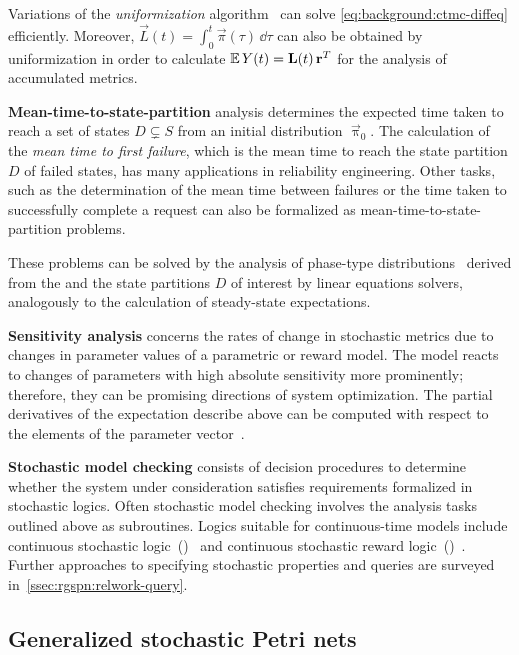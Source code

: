 Variations of the \emph{uniformization} algorithm~ can solve \cref{eq:background:ctmc-diffeq} efficiently. Moreover, \(\vec{L}(t) = \int_{0}^{t} \vec{\pi}(\tau) \,\dd\tau\) can also be obtained by uniformization in order to calculate \(\operatorname{\mathbb{E}} Y(t) = \bm{\mathrm{L}}(t) \, \bm{\mathrm{r}}^T\) for the analysis of accumulated metrics.

\newpara \textbf{Mean-time-to-state-partition} analysis determines the expected time taken to reach a set of states \(D \subsetneq S\) from an initial distribution \(\vec{\uppi}_0\). The calculation of the \emph{mean time to first failure}, which is the mean time to reach the state partition \(D\) of failed states, has many applications in reliability engineering. Other tasks, such as the determination of the mean time between failures or the time taken to successfully complete a request can also be formalized as mean-time-to-state-partition problems.

These problems can be solved by the analysis of phase-type distributions~\citep{Neuts75phasetype} derived from the  and the state partitions \(D\) of interest by linear equations solvers, analogously to the calculation of steady-state expectations.

\newpara \textbf{Sensitivity analysis} concerns the rates of change in stochastic metrics due to changes in parameter values of a parametric  or reward model. The model reacts to changes of parameters with high absolute sensitivity  more prominently; therefore, they can be promising directions of system optimization. The partial derivatives of the expectation describe above can be computed with respect to the elements of the parameter vector~\citep{Blake88sensitivity,Ramesh93sensitivity}.

\newpara \textbf{Stochastic model checking} consists of decision procedures to determine whether the system under consideration satisfies requirements formalized in stochastic logics. Often stochastic model checking involves the analysis tasks outlined above as subroutines. Logics suitable for continuous-time models include continuous stochastic logic~()~\citep{Aziz96csl} and continuous stochastic reward logic~()~\citep{Kwiatkowska06csrl}. Further approaches to specifying stochastic properties and queries are surveyed in~\vref{ssec:rgspn:relwork-query}.

\subsection{Generalized stochastic Petri nets}

\todo*{}

